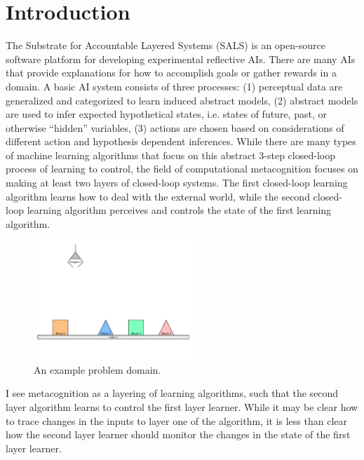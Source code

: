 \chapter{Introduction}
\label{chapter:introduction}

The Substrate for Accountable Layered Systems (SALS) is an open-source
software platform for developing experimental reflective AIs.  There
are many AIs that provide explanations for how to accomplish goals or
gather rewards in a domain.  A basic AI system consists of three
processes: (1) perceptual data are generalized and categorized to
learn induced abstract models, (2) abstract models are used to infer
expected hypothetical states, i.e. states of future, past, or
otherwise ``hidden'' variables, (3) actions are chosen based on
considerations of different action and hypothesis dependent
inferences.  While there are many types of machine learning algorithms
that focus on this abstract 3-step closed-loop process of learning to
control, the field of computational metacognition
\cite[]{cox_and_raja:2008,cox:2010} focuses on making at least two
layers of closed-loop systems.  The first closed-loop learning
algorithm learns how to deal with the external world, while the second
closed-loop learning algorithm perceives and controls the state of the
first learning algorithm.
\begin{figure}
  \includegraphics[width=6cm]{gfx/blocks_world_large-01}
  \caption[An example problem domain.]{An example problem domain.}
  \label{figure:introduction_example_problem_domain}
\end{figure}
I see metacognition as a layering of learning algorithms, such that
the second layer algorithm learns to control the first layer learner.
While it may be clear how to trace changes in the inputs to layer one
of the algorithm, it is less than clear how the second layer learner
should monitor the changes in the state of the first layer learner.

